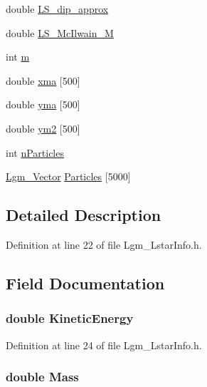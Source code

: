 \begin{CompactItemize}
\item 
double \hyperlink{struct_lgm___lstar_info_c11d4471d4e71707da1bbfdce47da54c}{LS\_\-dip\_\-approx}
\item 
double \hyperlink{struct_lgm___lstar_info_881b139aff4cc429e41c7ec564d32840}{LS\_\-McIlwain\_\-M}
\item 
int \hyperlink{struct_lgm___lstar_info_742204794ea328ba293fe59cec79b990}{m}
\item 
double \hyperlink{struct_lgm___lstar_info_7b60b67e8a8714de350f686c14a6866e}{xma} \mbox{[}500\mbox{]}
\item 
double \hyperlink{struct_lgm___lstar_info_911c5b5fff6eb68546281d9a63610f81}{yma} \mbox{[}500\mbox{]}
\item 
double \hyperlink{struct_lgm___lstar_info_33c7d04ab4147ef8853fb6621a6a7456}{ym2} \mbox{[}500\mbox{]}
\item 
int \hyperlink{struct_lgm___lstar_info_9e239b576529625f9b2f05c84b12b4a9}{nParticles}
\item 
\hyperlink{struct_lgm___vector}{Lgm\_\-Vector} \hyperlink{struct_lgm___lstar_info_5ff4824ef9c331c0e8a9683e62de9e98}{Particles} \mbox{[}5000\mbox{]}
\end{CompactItemize}


\subsection{Detailed Description}


Definition at line 22 of file Lgm\_\-LstarInfo.h.

\subsection{Field Documentation}
\hypertarget{struct_lgm___lstar_info_869c8a1c2af0f48c6e871b08c13d2852}{
\subsubsection[{KineticEnergy}]{\setlength{\rightskip}{0pt plus 5cm}double {\bf KineticEnergy}}}
\label{struct_lgm___lstar_info_869c8a1c2af0f48c6e871b08c13d2852}




Definition at line 24 of file Lgm\_\-LstarInfo.h.\hypertarget{struct_lgm___lstar_info_c33418187547ea28dda7063924f34df6}{
\subsubsection[{Mass}]{\setlength{\rightskip}{0pt plus 5cm}double {\bf Mass}}}
\label{struct_lgm___lstar_info_c33418187547ea28dda7063924f34df6}




